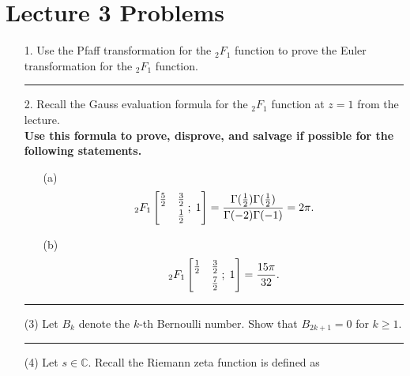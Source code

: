 \documentclass[12pt]{amsart}
\theoremstyle{definition}
\theoremstyle{remark}
\numberwithin{equation}{section}
\def\C{\mathbb C}
\def\C{\mathbb{C}}
\newcommand*\HYPERskip{&}
\newcommand*\pFq{
\begingroup
\catcode`\,\active
\def ,{\HYPERskip}%
\doHyper
}
\def\doHyper#1#2#3#4#5{%
\, _{#1}F_{#2}\left[\begin{matrix}#3 \smallskip \\  #4\end{matrix} \; ; \; #5\right]%
\endgroup
}
\begin{document}
\section*{Lecture 3 Problems}

\begin{itemize}

\item[1.] Use the Pfaff transformation for the $_{2}F_{1}$ function to prove the Euler transformation for the $_{2}F_{1}$ function.

\vspace{4mm}

\hrule{}

\vspace{8mm}

\item[2.] Recall the Gauss evaluation formula for the $_{2}F_{1}$ function at $z=1$ from the lecture.
\\

\textbf{Use this formula to prove, disprove, and salvage if possible for the following statements.}

\vspace{4mm}

\begin{itemize}

\item[(a)] $$\pFq{2}{1}{\frac{5}{2}&\frac{3}{2}}{&\frac{1}{2}}{1} = \frac{\Gamma(\frac{1}{2})\Gamma(\frac{1}{2})}{\Gamma(-2)\Gamma(-1)} = 2 \pi.$$

\vspace{4mm}

\item[(b)] $$\pFq{2}{1}{\frac{1}{2}&\frac{3}{2}}{&\frac{7}{2}}{1} = \frac{15 \pi}{32}.$$

\end{itemize}

\vspace{4mm}

\hrule{}

\vspace{8mm}

\item[(3)] Let $B_{k}$ denote the $k$-th Bernoulli number. Show that $B_{2k+1} = 0$ for $k \geq 1$.

\vspace{4mm}

\hrule{}

\vspace{8mm}

\item[(4)] Let $s \in \C$. Recall the Riemann zeta function is defined as 


\end{itemize}
\end{document}
